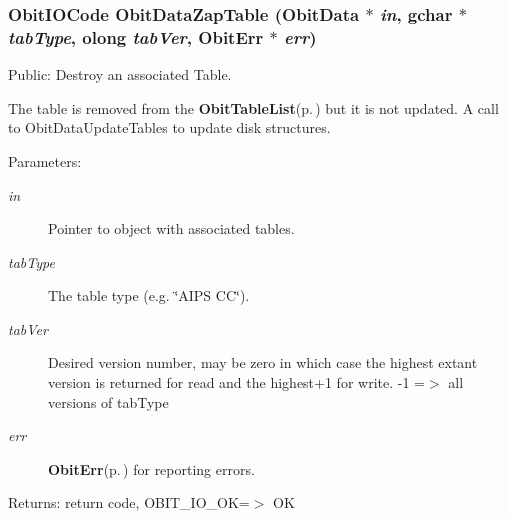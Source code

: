 \subsubsection{\setlength{\rightskip}{0pt plus 5cm}Obit\-IOCode Obit\-Data\-Zap\-Table ({\bf Obit\-Data} $\ast$ {\em in}, gchar $\ast$ {\em tab\-Type}, {\bf olong} {\em tab\-Ver}, {\bf Obit\-Err} $\ast$ {\em err})}\label{ObitData_8h_a43}


Public: Destroy an associated Table. 

The table is removed from the {\bf Obit\-Table\-List}{\rm (p.\,\pageref{structObitTableList})} but it is not updated. A call to Obit\-Data\-Update\-Tables to update disk structures. \begin{Desc}
\item[Parameters:]
\begin{description}
\item[{\em in}]Pointer to object with associated tables. \item[{\em tab\-Type}]The table type (e.g. \char`\"{}AIPS CC\char`\"{}). \item[{\em tab\-Ver}]Desired version number, may be zero in which case the highest extant version is returned for read and the highest+1 for write. -1 =$>$ all versions of tab\-Type \item[{\em err}]{\bf Obit\-Err}{\rm (p.\,\pageref{structObitErr})} for reporting errors. \end{description}
\end{Desc}
\begin{Desc}
\item[Returns:]return code, OBIT\_\-IO\_\-OK=$>$ OK \end{Desc}
